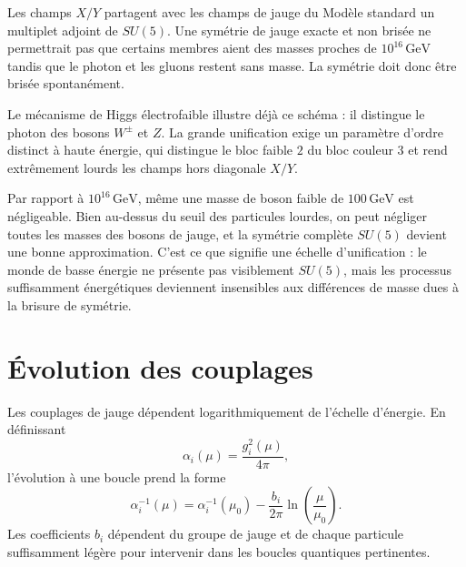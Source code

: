 Les champs \(X/Y\) partagent avec les champs de jauge du Modèle standard un multiplet adjoint de \(SU(5)\). Une symétrie de jauge exacte et non brisée ne permettrait pas que certains membres aient des masses proches de \(10^{16}\,\mathrm{GeV}\) tandis que le photon et les gluons restent sans masse. La symétrie doit donc être brisée spontanément.

\begin{classroomqa}
\end{classroomqa}

Le mécanisme de Higgs électrofaible illustre déjà ce schéma : il distingue le photon des bosons \(W^\pm\) et \(Z\). La grande unification exige un paramètre d’ordre distinct à haute énergie, qui distingue le bloc faible \(2\) du bloc couleur \(3\) et rend extrêmement lourds les champs hors diagonale \(X/Y\).

Par rapport à \(10^{16}\,\mathrm{GeV}\), même une masse de boson faible de \(100\,\mathrm{GeV}\) est négligeable. Bien au-dessus du seuil des particules lourdes, on peut négliger toutes les masses des bosons de jauge, et la symétrie complète \(SU(5)\) devient une bonne approximation. C’est ce que signifie une échelle d’unification : le monde de basse énergie ne présente pas visiblement \(SU(5)\), mais les processus suffisamment énergétiques deviennent insensibles aux différences de masse dues à la brisure de symétrie.

\section{Évolution des couplages}

Les couplages de jauge dépendent logarithmiquement de l’échelle d’énergie. En définissant
\begin{equation}
\alpha_i(\mu)=\frac{g_i^2(\mu)}{4\pi},
\end{equation}
l’évolution à une boucle prend la forme
\begin{equation}
\alpha_i^{-1}(\mu)
=
\alpha_i^{-1}(\mu_0)
-\frac{b_i}{2\pi}
\ln\!\left(\frac{\mu}{\mu_0}\right).
\label{eq:l10-running}
\end{equation}
Les coefficients \(b_i\) dépendent du groupe de jauge et de chaque particule suffisamment légère pour intervenir dans les boucles quantiques pertinentes.

